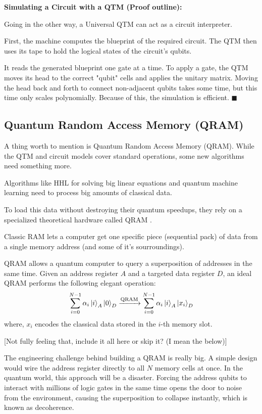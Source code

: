 \textbf{Simulating a Circuit with a QTM (Proof outline):}
%
%

Going in the other way, a Universal QTM can act as a circuit interpreter. 
%
%

First, the machine computes the blueprint of the required circuit. 
The QTM then uses its tape to hold the logical states of the circuit's qubits. 
%
%

It reads the generated blueprint one gate at a time. 
To apply a gate, the QTM moves its head to the correct "qubit" cells and applies the unitary matrix. 
Moving the head back and forth to connect non-adjacent qubits takes some time, but this time only scales polynomially. 
Because of this, the simulation is efficient. $\blacksquare$
%
%

\subsection{Quantum Random Access Memory (QRAM)}
%
%

A thing worth to mention is Quantum Random Access Memory (QRAM). 
While the QTM and circuit models cover standard operations, some new algorithms need something more. 
%
%

Algorithms like HHL for solving big linear equations \cite{harrow2009} and quantum machine learning 
need to process big amounts of classical data. 
%
%

To load this data without destroying their quantum speedups, 
they rely on a specialized theoretical hardware called QRAM \cite{giovannetti2008}.
%
%

Classic RAM lets a computer get one specific piece (sequential pack) of data from a 
single memory address (and some of it's sourroundings). 
%
%

QRAM allows a quantum computer to query a superposition of addresses in the same time. 
Given an address register $A$ and a targeted data register $D$, an ideal QRAM performs the following elegant operation:
\begin{equation}
    \sum_{i=0}^{N-1} \alpha_i \ket{i}_A \ket{0}_D \xrightarrow{\text{QRAM}} \sum_{i=0}^{N-1} \alpha_i \ket{i}_A \ket{x_i}_D
\end{equation}
where, $x_i$ encodes the classical data stored in the $i$-th memory slot.
%
%

[Not fully feeling that, include it all here or skip it? (I mean the below)]

The engineering challenge behind building a QRAM is really big. 
A simple design would wire the address register directly to all $N$ memory cells at once. 
In the quantum world, this approach will be a disaster. 
Forcing the address qubits to interact with millions of logic gates in the same time opens the door to noise from the environment, 
causing the superposition to collapse instantly, which is known as decoherence.

